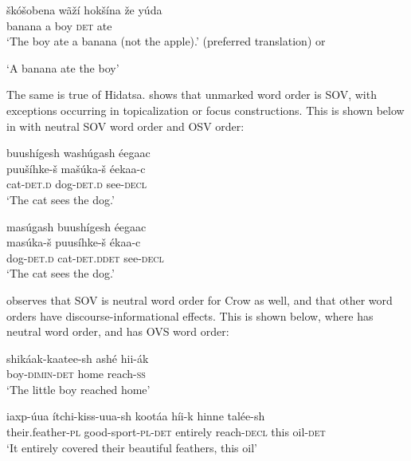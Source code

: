 \documentclass[output=paper]{LSP/langsci}
\begin{document}
\begin{exe}
\ex	\gll  \v{s}k\'o\v{s}obena w\~a\v{z}\'i 	hok\v{s}\'ina 	\v{z}e 		y\'uda \\
banana 		a 			boy 	\textsc{det} 	ate \\
\trans `The boy ate a banana (not the apple).' (preferred translation) or 

`A banana ate the boy'  \citep[49]{West2003} 
\end{exe}

The same is true of Hidatsa.  \citet{Boyle2007} shows that unmarked word order is SOV, with exceptions occurring in topicalization or focus constructions.  This is shown below in  with neutral SOV word order and  OSV order:
\pagebreak
\begin{exe}
\ex 
\glll buush\'igesh wash\'ugash \'eegaac\\
puu\v{s}\'ihke-\v{s}  ma\v{s}\'uka-\v{s} \'eekaa-c \\
cat-\textsc{det.d} dog-\textsc{det.d} see-\textsc{decl}  \\
\trans `The cat sees the dog.'  \citep[214]{Boyle2007}

\ex 
\glll mas\'ugash 		buush\'igesh 	\'eegaac\\
mas\'uka-\v{s} 		puus\'ihke-\v{s} 	\'ekaa-c \\
dog-\textsc{det.d} 		cat-\textsc{det.d}\textsc{det}	see-\textsc{decl} \\
\trans `The cat sees the dog.' \citep[214]{Boyle2007}

\end{exe}
	
\citet{Graczyk1991} observes that SOV is neutral word order for Crow as well, and that other word orders have discourse-informational effects.  This is shown below, where  has neutral word order, and  has OVS word order:

\begin{exe}
\ex \gll shik\'aak-kaatee-sh ash\'e 		hii-\'ak \\
boy-\textsc{dimin-det} 		home 	reach-\textsc{ss} \\
\trans `The little boy reached home' \citep[101]{Graczyk1991}

\ex \gll iaxp-\'uua 		\'itchi-kiss-uua-sh			koot\'aa 	h\'ii-k 	hinne		tal\'ee-sh \\
their.feather-\textsc{pl} good-sport-\textsc{pl}-\textsc{det}		entirely 	reach-\textsc{decl}	this 	oil-\textsc{det} \\
\trans `It entirely covered their beautiful feathers, this oil' \citep[103]{Graczyk1991}
\end{exe}
\end{document}
